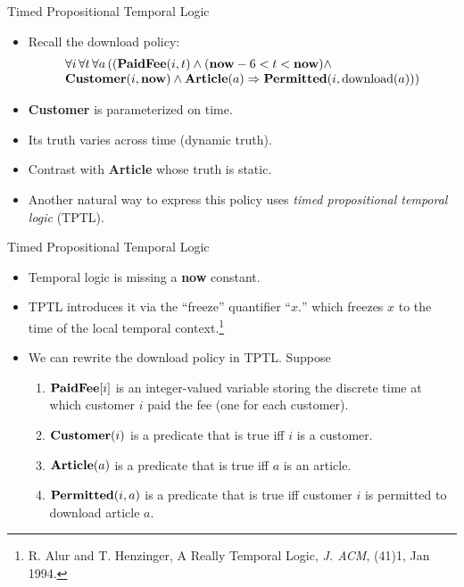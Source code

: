 \begin{wideslide}[bm=,toc=]{Timed Propositional Temporal Logic}
\begin{itemize}
\item Recall the download policy:
\pause
\begin{displaymath}
\begin{array}{l}
\forall i\, \forall t\, \forall a\, ((\mbox{\bf PaidFee}(i,t)\wedge (\mbox{\bf now} - 6 < t < \mbox{\bf now})\wedge \\
\mbox{\bf Customer}(i,\mbox{\bf now})\wedge\mbox{\bf Article}(a) \Rightarrow \mbox{\bf Permitted}(i,\mbox{\rm download}(a)))
\end{array}
\end{displaymath}
\item<3-> {\bf Customer} is parameterized on time.
\item<4-> Its truth varies across time (dynamic truth).
\item<5-> Contrast with {\bf Article} whose truth is static.
\item<6-> Another natural way to express this policy uses {\em timed propositional temporal logic\/} (TPTL).
\end{itemize}
\end{wideslide}

\begin{wideslide}[bm=,toc=]{Timed Propositional Temporal Logic}
\begin{itemize}
\item Temporal logic is missing a {\bf now} constant.
\item<2-> TPTL introduces it via the ``freeze'' quantifier ``$x.$'' which freezes $x$ to the
time of the local temporal context.\footnote{
R. Alur and T. Henzinger, A Really Temporal Logic, {\em J. ACM\/},
(41)1, Jan 1994.}
\item<3-> We can rewrite the download policy in TPTL.  Suppose
\begin{enumerate}
\item<4-> $\mbox{\bf PaidFee}[i]$ is an integer-valued variable storing
the discrete time at which customer $i$ paid the fee (one for each customer).
\item<5->$\mbox{\bf Customer}(i)$ is a predicate that is true iff $i$ is a customer.
\item<6->$\mbox{\bf Article}(a)$ is a predicate that is true iff $a$ is an article.
\item<7->$\mbox{\bf Permitted}(i,a)$ is a predicate that is true iff 
customer $i$ is permitted to download article $a$.
\end{enumerate}
\end{itemize}
\end{wideslide}


